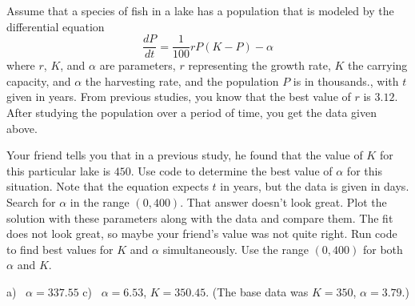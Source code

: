 \begin{exercise}\label{ex:ModelingParamPop}
Assume that a species of fish in a lake has a population that is modeled by the differential equation
\begin{equation*}
\frac{dP}{dt} = \frac{1}{100}rP(K - P) - \alpha 
\end{equation*}
where $r$, $K$, and $\alpha$ are parameters, $r$ representing the growth rate, $K$ the carrying capacity, and $\alpha$ the harvesting rate, and the population $P$ is in thousands., with $t$ given in years. From previous studies, you know that the best value of $r$ is $3.12$. After studying the population over a period of time, you get the data given above.
\begin{tasks}
\task Your friend tells you that in a previous study, he found that the value of $K$ for this particular lake is $450$. Use code to determine the best value of $\alpha$ for this situation. Note that the equation expects $t$ in years, but the data is given in days. Search for $\alpha$ in the range $(0, 400)$.
\task That answer doesn't look great. Plot the solution with these parameters along with the data and compare them.
\task The fit does not look great, so maybe your friend's value was not quite right. Run code to find best values for $K$ and $\alpha$ simultaneously. Use the range $(0, 400)$ for both $\alpha$ and $K$.
\end{tasks}

\end{exercise}
\comboSol{%
}
{%
a)~ $\alpha = 337.55$ \quad c)~ $\alpha = 6.53$, $K = 350.45$. (The base data was $K = 350$, $\alpha = 3.79$.)
}


